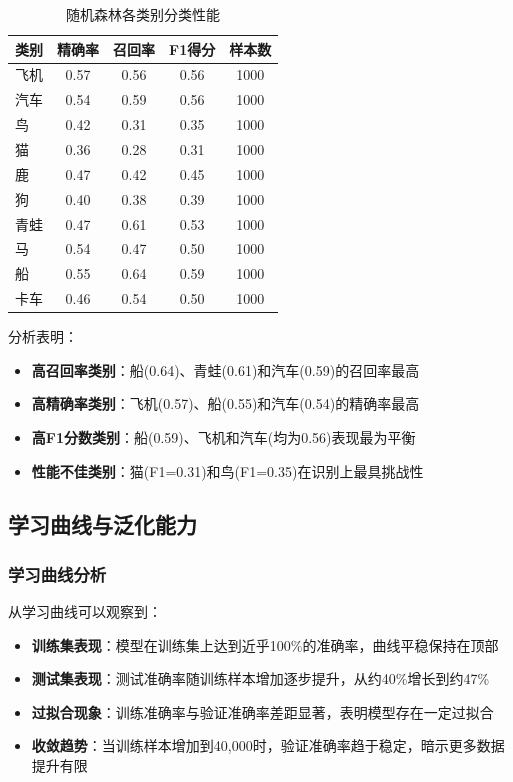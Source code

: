 \documentclass[UTF8]{report}
\theoremstyle{MyLineTheoremStyle} %
\theoremstyle{MyBlockTheoremStyle} %
\theoremstyle{MySubsubsectionStyle} %
\begin{document}
\begin{table}[h]
\centering
\caption{随机森林各类别分类性能}
\label{tab:rf_class_performance}
\begin{tabular}{l c c c c}
\toprule
\textbf{类别} & \textbf{精确率} & \textbf{召回率} & \textbf{F1得分} & \textbf{样本数} \\
\midrule
飞机 & 0.57 & 0.56 & 0.56 & 1000 \\
汽车 & 0.54 & 0.59 & 0.56 & 1000 \\
鸟 & 0.42 & 0.31 & 0.35 & 1000 \\
猫 & 0.36 & 0.28 & 0.31 & 1000 \\
鹿 & 0.47 & 0.42 & 0.45 & 1000 \\
狗 & 0.40 & 0.38 & 0.39 & 1000 \\
青蛙 & 0.47 & 0.61 & 0.53 & 1000 \\
马 & 0.54 & 0.47 & 0.50 & 1000 \\
船 & 0.55 & 0.64 & 0.59 & 1000 \\
卡车 & 0.46 & 0.54 & 0.50 & 1000 \\
\bottomrule
\end{tabular}
\end{table}

分析表明：
\begin{itemize}
    \item \textbf{高召回率类别}：船(0.64)、青蛙(0.61)和汽车(0.59)的召回率最高
    \item \textbf{高精确率类别}：飞机(0.57)、船(0.55)和汽车(0.54)的精确率最高
    \item \textbf{高F1分数类别}：船(0.59)、飞机和汽车(均为0.56)表现最为平衡
    \item \textbf{性能不佳类别}：猫(F1=0.31)和鸟(F1=0.35)在识别上最具挑战性
\end{itemize}

\subsection{学习曲线与泛化能力}

\subsubsection{学习曲线分析}
从学习曲线可以观察到：
\begin{itemize}
    \item \textbf{训练集表现}：模型在训练集上达到近乎100\%的准确率，曲线平稳保持在顶部
    \item \textbf{测试集表现}：测试准确率随训练样本增加逐步提升，从约40\%增长到约47\%
    \item \textbf{过拟合现象}：训练准确率与验证准确率差距显著，表明模型存在一定过拟合
    \item \textbf{收敛趋势}：当训练样本增加到40,000时，验证准确率趋于稳定，暗示更多数据提升有限
\end{itemize}
\end{document}

